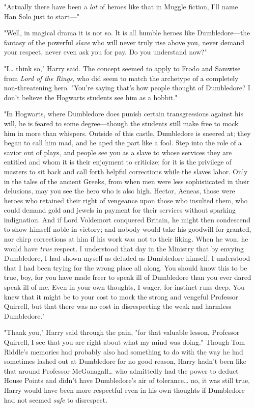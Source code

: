 "Actually there have been a \emph{lot} of heroes like that in Muggle fiction,
I'll name Han Solo just to start---"

"Well, in magical drama it is not so. It is all humble heroes like
Dumbledore---the fantasy of the powerful \emph{slave} who will never truly rise
above you, never demand your respect, never even ask you for pay. Do you
understand now?"

"I{\ldots} think so," Harry said. The concept seemed to apply to Frodo and
Samwise from \emph{Lord of the Rings,} who did seem to match the archetype of a
completely non-threatening hero. "You're saying that's how people thought of
Dumbledore? I don't believe the Hogwarts students see him as a hobbit."

"In Hogwarts, where Dumbledore does punish certain transgressions against his
will, he is feared to some degree---though the students still make free to mock
him in more than whispers. Outside of this castle, Dumbledore is sneered at;
they began to call him mad, and he aped the part like a fool. Step into the
role of a savior out of plays, and people see you as a slave to whose services
they are entitled and whom it is their enjoyment to criticize; for it is the
privilege of masters to sit back and call forth helpful corrections while the
slaves labor. Only in the tales of the ancient Greeks, from when men were less
sophisticated in their delusions, may you see the hero who is also high.
Hector, Aeneas, those were heroes who retained their right of vengeance upon
those who insulted them, who could demand gold and jewels in payment for their
services without sparking indignation. And if Lord Voldemort conquered Britain,
he might then condescend to show himself noble in victory; and nobody would
take his goodwill for granted, nor chirp corrections at him if his work was not
to their liking. When he won, he would have \emph{true} respect. I understood
that day in the Ministry that by envying Dumbledore, I had shown myself as
deluded as Dumbledore himself. I understood that I had been trying for the
wrong place all along. You should know this to be true, boy, for you have made
freer to speak ill of Dumbledore than you ever dared speak ill of me. Even in
your own thoughts, I wager, for instinct runs deep. You knew that it might be
to your cost to mock the strong and vengeful Professor Quirrell, but that there
was no cost in disrespecting the weak and harmless Dumbledore."

"Thank you," Harry said through the pain, "for that valuable lesson, Professor
Quirrell, I see that you are right about what my mind was doing." Though Tom
Riddle's memories had probably also had something to do with the way he had
sometimes lashed out at Dumbledore for no good reason, Harry hadn't been like
that around Professor McGonagall{\ldots} who admittedly had the power to deduct
House Points and didn't have Dumbledore's air of tolerance{\ldots} no, it was
still true, Harry would have been more respectful even in his own thoughts if
Dumbledore had not seemed \emph{safe} to disrespect.

